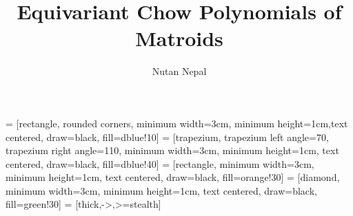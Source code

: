 \documentclass[final]{beamer}
\title{Equivariant Chow Polynomials of Matroids} %
\author{Nutan Nepal} %
\institute{North Carolina State University} %
\begin{document}
 = [rectangle, rounded corners, minimum width=3cm, minimum height=1cm,text centered, draw=black, fill=dblue!10]
 = [trapezium, trapezium left angle=70, trapezium right angle=110, minimum width=3cm, minimum height=1cm, text centered, draw=black, fill=dblue!40]
 = [rectangle, minimum width=3cm, minimum height=1cm, text centered, draw=black, fill=orange!30]
 = [diamond, minimum width=3cm, minimum height=1cm, text centered, draw=black, fill=green!30]
 = [thick,->,>=stealth]




\setlength{\belowcaptionskip}{2ex} %
\setlength\belowdisplayshortskip{2ex} %
\end{document}
